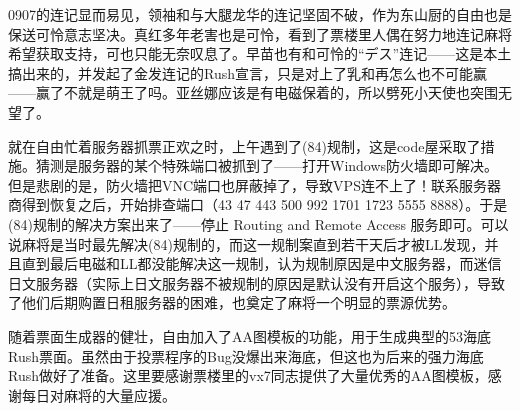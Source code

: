 
0907的连记显而易见，领袖和与大腿龙华的连记坚固不破，作为东山厨的自由也是保送可怜意志坚决。真红多年老害也是可怜，看到了票楼里人偶在努力地连记麻将希望获取支持，可也只能无奈叹息了。早苗也有和可怜的“デス”连记——这是本土搞出来的，并发起了金发连记的Rush宣言，只是对上了乳和再怎么也不可能赢——赢了不就是萌王了吗。亚丝娜应该是有电磁保着的，所以劈死小天使也突围无望了。

就在自由忙着服务器抓票正欢之时，上午遇到了(84)规制，这是code屋采取了措施。猜测是服务器的某个特殊端口被抓到了——打开Windows防火墙即可解决。但是悲剧的是，防火墙把VNC端口也屏蔽掉了，导致VPS连不上了！联系服务器商得到恢复之后，开始排查端口（43 47 443 500 992 1701 1723 5555 8888）。于是(84)规制的解决方案出来了——停止 Routing and Remote Access 服务即可。可以说麻将是当时最先解决(84)规制的，而这一规制案直到若干天后才被LL发现，并且直到最后电磁和LL都没能解决这一规制，认为规制原因是中文服务器，而迷信日文服务器（实际上日文服务器不被规制的原因是默认没有开启这个服务），导致了他们后期购置日租服务器的困难，也奠定了麻将一个明显的票源优势。

随着票面生成器的健壮，自由加入了AA图模板的功能，用于生成典型的53海底Rush票面。虽然由于投票程序的Bug没爆出来海底，但这也为后来的强力海底Rush做好了准备。这里要感谢票楼里的vx7同志提供了大量优秀的AA图模板，感谢每日对麻将的大量应援。

